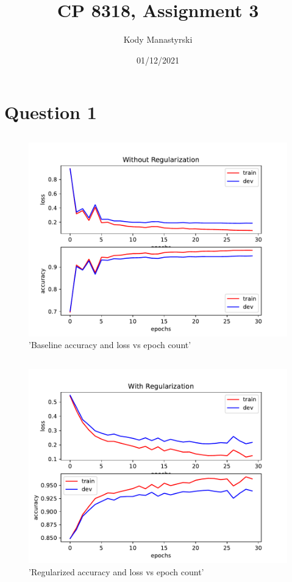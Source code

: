 \documentclass{article}
\title{CP 8318, Assignment 3}
\author{Kody Manastyrski}
\date{01/12/2021}
\begin{document}
\maketitle

\section{Question 1}
\subsection{}

\begin{figure}
	\centering
	\includegraphics[width=\textwidth]{./mnist/baseline.pdf}
	\caption{'Baseline accuracy and loss vs epoch count'}
	\label{baseline}
\end{figure}

\subsection{}

\begin{figure}
	\centering
	\includegraphics[width=\textwidth]{./mnist/regularized.pdf}
	\caption{'Regularized accuracy and loss vs epoch count'}
	\label{regularized}
\end{figure}
\end{document}
